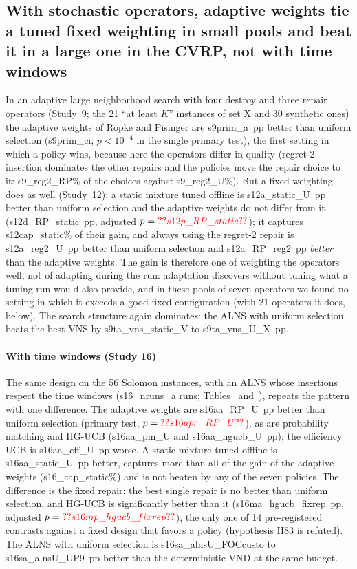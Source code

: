 \subsection{With stochastic operators, adaptive weights tie a tuned fixed weighting in small pools and beat it in a large one in the CVRP, not with time windows}\label{sec:r5}
In an adaptive large neighborhood search with four destroy and three repair operators (Study~9; the 21 ``at least $K$'' instances of set X and 30 synthetic ones) the adaptive weights of Ropke and Pisinger are \num{s9prim_a}~pp better than uniform selection (\num{s9prim_ci}; $p<10^{-4}$ in the single primary test), the first setting in which a policy wins, because here the operators differ in quality (regret-2 insertion dominates the other repairs and the policies move the repair choice to it: \num{s9_reg2_RP}\% of the choices against \num{s9_reg2_U}\%). But a fixed weighting does as well (Study~12): a static mixture tuned offline is \num{s12a_static_U}~pp better than uniform selection and the adaptive weights do not differ from it (\num{s12d_RP_static}~pp, adjusted $p=\num{s12p_RP_static}$); it captures \num{s12cap_static}\% of their gain, and always using the regret-2 repair is \num{s12a_reg2_U}~pp better than uniform selection and \num{s12a_RP_reg2}~pp \emph{better} than the adaptive weights. The gain is therefore one of weighting the operators well, not of adapting during the run: adaptation discovers without tuning what a tuning run would also provide, and in these pools of seven operators we found no setting in which it exceeds a good fixed configuration (with 21 operators it does, below). The search structure again dominates: the ALNS with uniform selection beats the best VNS by \num{s9ta_vns_static_V} to \num{s9ta_vns_U_X}~pp.

\paragraph{With time windows (Study 16)} The same design on the 56 Solomon instances, with an ALNS whose insertions respect the time windows (\num{s16_nruns_a} runs; Tables~ and~), repeats the pattern with one difference. The adaptive weights are \num{s16aa_RP_U}~pp better than uniform selection (primary test, $p=\num{s16apr_RP_U}$), as are probability matching and HG-UCB (\num{s16aa_pm_U} and \num{s16aa_hgucb_U}~pp); the efficiency UCB is \num{s16aa_eff_U}~pp worse. A static mixture tuned offline is \num{s16aa_static_U}~pp better, captures more than all of the gain of the adaptive weights (\num{s16_cap_static}\%) and is not beaten by any of the seven policies. The difference is the fixed repair: the best single repair is no better than uniform selection, and HG-UCB is significantly better than it (\num{s16ma_hgucb_fixrep}~pp, adjusted $p=\num{s16mp_hgucb_fixrep}$), the only one of 14 pre-registered contrasts against a fixed design that favors a policy (hypothesis H83 is refuted). The ALNS with uniform selection is \num{s16sa_alnsU_FOCcusto} to \num{s16sa_alnsU_UP9}~pp better than the deterministic VND at the same budget.

